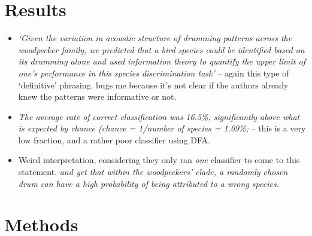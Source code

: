\documentclass[
]{book}
\begin{document}
\hypertarget{results-16}{%
\section{Results}\label{results-16}}

\begin{itemize}
\item
  \emph{`Given the variation in acoustic structure of drumming patterns across the woodpecker family, we predicted that a bird species could be identified based on its drumming alone and used information theory to quantify the upper limit of one's performance in this species discrimination task'} -- again this type of `definitive' phrasing. bugs me because it's not clear if the authors already knew the patterns were informative or not.
\item
  \emph{The average rate of correct classification was 16.5\%, significantly above what is expected by chance (chance = 1/number of species = 1.09\%;} -- this is a very low fraction, and a rather poor classifier using DFA.
\item
  Weird interpretation, considering they only ran \emph{one} classifier to come to this statement. \emph{and yet that within the woodpeckers' clade, a randomly chosen drum can have a high probability of being attributed to a wrong species.}
\end{itemize}

\hypertarget{methods-16}{%
\section{Methods}\label{methods-16}}
\end{document}
